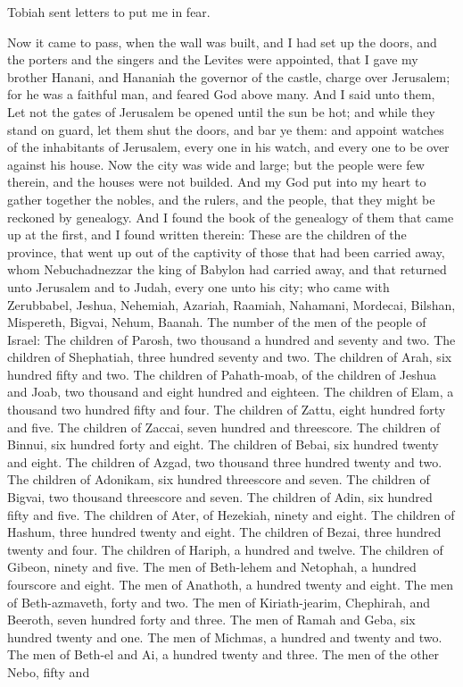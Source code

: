 Tobiah sent letters to put me in fear. 

Now it came to pass, when the wall was built, and I had set up the doors, and the porters and the singers and the Levites were appointed, that I gave my brother Hanani, and Hananiah the governor of the castle, charge over Jerusalem; for he was a faithful man, and feared God above many. And I said unto them, Let not the gates of Jerusalem be opened until the sun be hot; and while they stand on guard, let them shut the doors, and bar ye them: and appoint watches of the inhabitants of Jerusalem, every one in his watch, and every one to be over against his house. Now the city was wide and large; but the people were few therein, and the houses were not builded.  And my God put into my heart to gather together the nobles, and the rulers, and the people, that they might be reckoned by genealogy. And I found the book of the genealogy of them that came up at the first, and I found written therein: These are the children of the province, that went up out of the captivity of those that had been carried away, whom Nebuchadnezzar the king of Babylon had carried away, and that returned unto Jerusalem and to Judah, every one unto his city; who came with Zerubbabel, Jeshua, Nehemiah, Azariah, Raamiah, Nahamani, Mordecai, Bilshan, Mispereth, Bigvai, Nehum, Baanah. The number of the men of the people of Israel: The children of Parosh, two thousand a hundred and seventy and two. The children of Shephatiah, three hundred seventy and two. The children of Arah, six hundred fifty and two. The children of Pahath-moab, of the children of Jeshua and Joab, two thousand and eight hundred and eighteen. The children of Elam, a thousand two hundred fifty and four. The children of Zattu, eight hundred forty and five. The children of Zaccai, seven hundred and threescore. The children of Binnui, six hundred forty and eight. The children of Bebai, six hundred twenty and eight. The children of Azgad, two thousand three hundred twenty and two. The children of Adonikam, six hundred threescore and seven. The children of Bigvai, two thousand threescore and seven. The children of Adin, six hundred fifty and five. The children of Ater, of Hezekiah, ninety and eight. The children of Hashum, three hundred twenty and eight. The children of Bezai, three hundred twenty and four. The children of Hariph, a hundred and twelve. The children of Gibeon, ninety and five. The men of Beth-lehem and Netophah, a hundred fourscore and eight. The men of Anathoth, a hundred twenty and eight. The men of Beth-azmaveth, forty and two. The men of Kiriath-jearim, Chephirah, and Beeroth, seven hundred forty and three. The men of Ramah and Geba, six hundred twenty and one. The men of Michmas, a hundred and twenty and two. The men of Beth-el and Ai, a hundred twenty and three. The men of the other Nebo, fifty and 